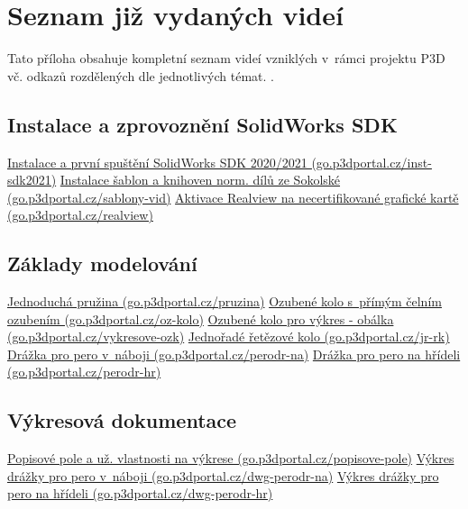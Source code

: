 \chapter{Seznam již vydaných videí} \label{released-videos}
Tato příloha obsahuje kompletní seznam videí vzniklých v~rámci projektu P3D vč. odkazů rozdělených dle jednotlivých témat. \newline
\noindent{}.

\section{Instalace a zprovoznění SolidWorks SDK} \label{videa-instalace}
\href{https://go.p3dportal.cz/inst-sdk2021}{Instalace a první spuštění SolidWorks SDK 2020/2021 (go.p3dportal.cz/inst-sdk2021)} \newline
\href{https://go.p3dportal.cz/sablony-vid}{Instalace šablon a knihoven norm. dílů ze Sokolské (go.p3dportal.cz/sablony-vid)} \newline
\href{https://go.p3dportal.cz/GkkCtx}{Aktivace Realview na necertifikované grafické kartě (go.p3dportal.cz/realview)} \newline

\section{Základy modelování} \label{videa-modelovani}
\href{https://go.p3dportal.cz/pruzina}{Jednoduchá pružina (go.p3dportal.cz/pruzina)} \newline
\href{https://go.p3dportal.cz/oz-kolo}{Ozubené kolo s~přímým čelním ozubením (go.p3dportal.cz/oz-kolo)} \newline
\href{https://go.p3dportal.cz/vykresove-ozk}{Ozubené kolo pro výkres - obálka (go.p3dportal.cz/vykresove-ozk)} \newline
\href{https://go.p3dportal.cz/jr-rk}{Jednořadé řetězové kolo (go.p3dportal.cz/jr-rk)} \newline
\href{https://go.p3dportal.cz/perodr-na}{Drážka pro pero v~náboji (go.p3dportal.cz/perodr-na)} \newline
\href{https://go.p3dportal.cz/perodr-hr}{Drážka pro pero na hřídeli (go.p3dportal.cz/perodr-hr)} \newline

\newpage

\section{Výkresová dokumentace} \label{videa-vykresy}
\href{https://go.p3dportal.cz/popisove-pole}{Popisové pole a už. vlastnosti na výkrese (go.p3dportal.cz/popisove-pole)} \newline
\href{https://go.p3dportal.cz/dwg-perodr-na}{Výkres drážky pro pero v~náboji (go.p3dportal.cz/dwg-perodr-na)} \newline
\href{https://go.p3dportal.cz/dwg-perodr-hr}{Výkres drážky pro pero na hřídeli (go.p3dportal.cz/dwg-perodr-hr)} \newline


